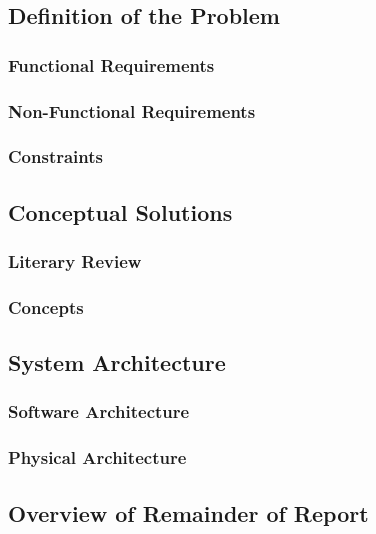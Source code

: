 \documentclass[titlepage]{article}
\begin{document}
\subsection{Definition of the Problem}


\subsubsection{Functional Requirements}


\subsubsection{Non-Functional Requirements}


\subsubsection{Constraints}


\subsection{Conceptual Solutions}

\subsubsection{Literary Review}

\subsubsection{Concepts}


\subsection{System Architecture}


\subsubsection{Software Architecture}


\subsubsection{Physical Architecture}

\subsection{Overview of Remainder of Report}
\end{document}
